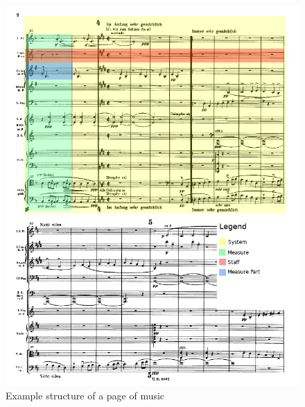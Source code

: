 \begin{figure}
    \includegraphics[width=\textwidth]{images/score-structure.png}
    \centering
    \caption{Example structure of a page of music}
    \label{fig:page-structure}
\end{figure}

